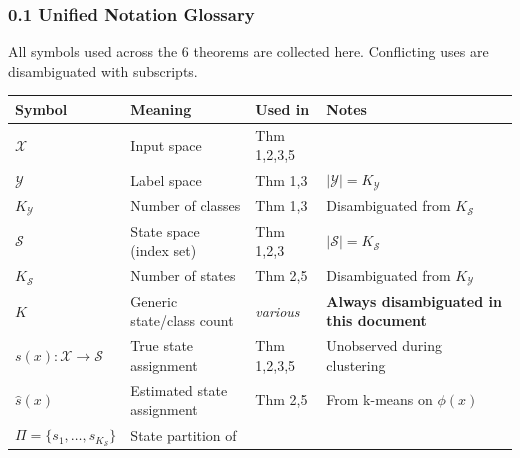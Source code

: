 \documentclass[
  12pt,
]{ctexart}
\begin{document}
\subsubsection{0.1 Unified Notation
Glossary}\label{unified-notation-glossary}

All symbols used across the 6 theorems are collected here. Conflicting
uses are disambiguated with subscripts.

\begin{longtable}[]{@{}
  >{\raggedright\arraybackslash}p{}
  >{\raggedright\arraybackslash}p{}
  >{\raggedright\arraybackslash}p{}
  >{\raggedright\arraybackslash}p{}@{}}
\toprule\noalign{}
\begin{minipage}[b]{\linewidth}\raggedright
Symbol
\end{minipage} & \begin{minipage}[b]{\linewidth}\raggedright
Meaning
\end{minipage} & \begin{minipage}[b]{\linewidth}\raggedright
Used in
\end{minipage} & \begin{minipage}[b]{\linewidth}\raggedright
Notes
\end{minipage} \\
\midrule\noalign{}
\endhead
\bottomrule\noalign{}
\endlastfoot
\(\mathcal{X}\) & Input space & Thm 1,2,3,5 & \\
\(\mathcal{Y}\) & Label space & Thm 1,3 &
\(|\mathcal{Y}| = K_{\mathcal{Y}}\) \\
\(K_{\mathcal{Y}}\) & Number of classes & Thm 1,3 & Disambiguated from
\(K_{\mathcal{S}}\) \\
\(\mathcal{S}\) & State space (index set) & Thm 1,2,3 &
\(|\mathcal{S}| = K_{\mathcal{S}}\) \\
\(K_{\mathcal{S}}\) & Number of states & Thm 2,5 & Disambiguated from
\(K_{\mathcal{Y}}\) \\
\(K\) & Generic state/class count & \emph{various} & \textbf{Always
disambiguated in this document} \\
\(s(x) : \mathcal{X} \to \mathcal{S}\) & True state assignment & Thm
1,2,3,5 & Unobserved during clustering \\
\(\hat{s}(x)\) & Estimated state assignment & Thm 2,5 & From k-means on
\(\phi(x)\) \\
\(\Pi = \{s_1,\dots,s_{K_{\mathcal{S}}}\}\) & State partition of

\end{longtable}
\end{document}
